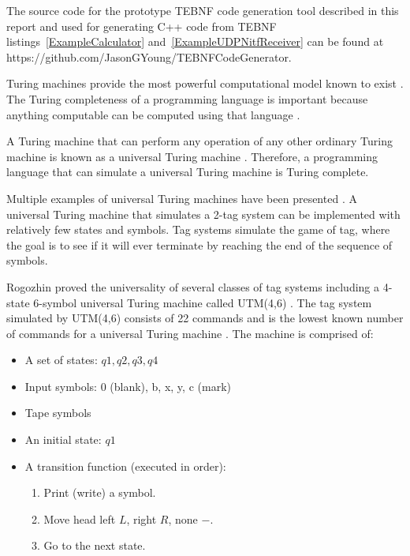\indent
The source code for the prototype TEBNF code generation tool described in this report and used for generating C++ code from TEBNF listings~\ref{ExampleCalculator} and~\ref{ExampleUDPNitfReceiver} can be found at https://github.com/JasonGYoung/TEBNFCodeGenerator.


\label{appendix:TEBNFTuringCompletenessProof}

Turing machines provide the most powerful computational model known to exist \cite{kepser_01}.  The Turing completeness of a programming language is important because anything computable can be computed using that language \cite{kepser_01}.

\indent
A Turing machine that can perform any operation of any other ordinary Turing machine is known as a universal Turing machine \cite{moore_01}.  Therefore, a programming language that can simulate a universal Turing machine is Turing complete.

Multiple examples of universal Turing machines have been presented \cite{rogozhin_01,shannon_01,neary_01}.  A universal Turing machine that simulates a 2-tag system can be implemented with relatively few states and symbols.  Tag systems simulate the game of tag, where the goal is to see if it will ever terminate by reaching the end of the sequence of symbols.

\indent
Rogozhin proved the universality of several classes of tag systems including a 4-state 6-symbol universal Turing machine called UTM(4,6) \cite{rogozhin_01}.  The tag system simulated by UTM(4,6) consists of 22 commands and is the lowest known number of commands for a universal Turing machine \cite{rogozhin_01}.  The machine is comprised of:
\begin{itemize}
  \item A set of states: $q1, q2, q3, q4$
  \item Input symbols: 0 (blank), b, x, y, c (mark)
  \item Tape symbols
  \item An initial state: $q1$
  \item A transition function (executed in order):
  \begin{enumerate}
    \item Print (write) a symbol.
    \item Move head left $L$, right $R$, none $-$.
    \item Go to the next state. 
  \end{enumerate}
\end{itemize}


